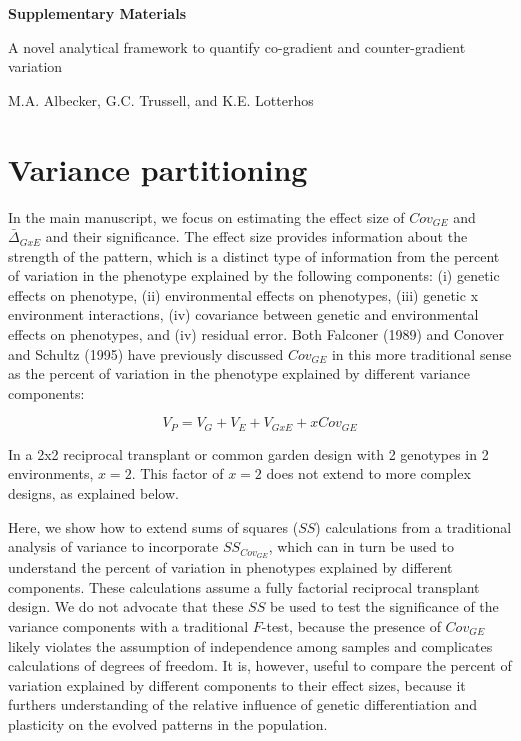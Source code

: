 \documentclass[11pt, oneside]{amsart}
\begin{document}


{ \Large \bf Supplementary Materials}

A novel analytical framework to quantify co-gradient and counter-gradient variation 

M.A. Albecker, G.C. Trussell, and K.E. Lotterhos

\hspace{3cm}

\tableofcontents
\listoffigures

\newpage
\renewcommand\thesection{Supplemental Methods}
\section{Variance partitioning}

In the main manuscript, we focus on estimating the effect size of $Cov_{GE}$ and $\bar\Delta_{GxE}$ and their significance. The effect size provides information about the strength of the pattern, which is a distinct type of information from the percent of variation in the phenotype explained by the following components: (i) genetic effects on phenotype, (ii) environmental effects on phenotypes, (iii) genetic x environment interactions, (iv) covariance between genetic and environmental effects on phenotypes, and (iv) residual error. Both Falconer (1989) and Conover and Schultz (1995) have previously discussed $Cov_{GE}$ in this more traditional sense as the percent of variation in the phenotype explained by different variance components:

\begin{equation}
V_P = V_G + V_E + V_{GxE} + xCov_{GE} 
\end{equation}

In a 2x2 reciprocal transplant or common garden design with 2 genotypes in 2 environments, $x = 2$. This factor of $x = 2$ does not extend to more complex designs, as explained below.

Here, we show how to extend sums of squares ($SS$) calculations from a traditional analysis of variance to incorporate $SS_{Cov_{GE}}$, which can in turn be used to understand the percent of variation in phenotypes explained by different components.  These calculations assume a fully factorial reciprocal transplant design. We do not advocate that these $SS$ be used to test the significance of the variance components with a traditional $F$-test, because the presence of $Cov_{GE}$ likely violates the assumption of independence among samples and complicates calculations of degrees of freedom.  It is, however, useful to compare the percent of variation explained by different components to their effect sizes, because it furthers understanding of the relative influence of genetic differentiation and plasticity on the evolved patterns in the population.
\end{document}
